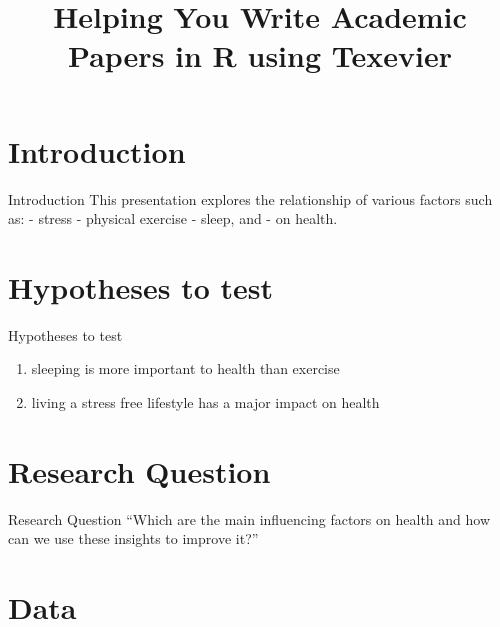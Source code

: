 \documentclass[
  11pt,
  ignorenonframetext,
]{elsarticle}
\title{Helping You Write Academic Papers in R using Texevier}
\author{}
\date{\vspace{-2.5em}}
\providecommand{\tightlist}{%
  \setlength{\itemsep}{0pt}\setlength{\parskip}{0pt}}
\begin{document}
\frame{\titlepage}

\begin{frame}
\end{frame}

\section{\texorpdfstring{Introduction
\label{Introduction}}{Introduction }}\label{introduction}

\begin{frame}{Introduction \label{Introduction}}
This presentation explores the relationship of various factors such as:
- stress - physical exercise - sleep, and - on health.
\end{frame}

\section{Hypotheses to test}\label{hypotheses-to-test}

\begin{frame}{Hypotheses to test}
\begin{enumerate}
\tightlist
\item
  sleeping is more important to health than exercise
\item
  living a stress free lifestyle has a major impact on health
\end{enumerate}
\end{frame}

\section{Research Question}\label{research-question}

\begin{frame}{Research Question}
``Which are the main influencing factors on health and how can we use
these insights to improve it?''
\end{frame}

\section{Data}\label{data}
\end{document}
